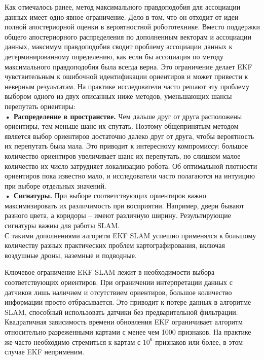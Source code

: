 \documentclass[10pt,a4paper]{article}
\begin{document}
Как отмечалось ранее, метод максимального правдоподобия для ассоциации данных имеет одно явное ограничение. Дело в том, что он отходит от идеи полной апостериорной оценки в вероятностной робототехнике. Вместо поддержки общего апостериорного распределения по дополненным векторам и ассоциации данных, максимум правдоподобия сводит проблему ассоциации данных к детерминированному определению, как если бы ассоциация по методу максимального правдоподобия была всегда верна. Это ограничение делает EKF чувствительным к ошибочной идентификации ориентиров и может привести к неверным результатам. На практике исследователи часто решают эту проблему выбором одного из двух описанных ниже методов, уменьшающих шансы перепутать ориентиры:\\

\textbf{•	Распределение в пространстве.} Чем дальше друг от друга расположены ориентиры, тем меньше шанс их спутать. Поэтому общепринятым методом является выбор ориентиров достаточно далеко друг от друга, чтобы вероятность их перепутать была мала. Это приводит к интересному компромиссу: большое количество ориентиров увеличивает шанс их перепутать, но слишком малое количество их число затрудняет локализацию робота. Об оптимальной плотности ориентиров пока известно мало, и исследователи часто полагаются на интуицию при выборе отдельных значений.\\

\textbf{•	Сигнатуры.} При выборе соответствующих ориентиров важно максимизировать их различимость при восприятии. Например, двери бывают разного цвета, а коридоры – имеют различную ширину. Результирующие сигнатуры важны для работы SLAM.\\

С такими дополнениями алгоритм EKF SLAM успешно применялся к большому количеству разных практических проблем картографирования, включая воздушные дроны, наземные и подводные.

Ключевое ограничение EKF SLAM лежит в необходимости выбора соответствующих ориентиров. При ограничении интерпретации данных с датчиков лишь наличием и отсутствием ориентиров, большое количество информации просто отбрасывается. Это приводит к потере данных в алгоритме SLAM, способный использовать датчики без предварительной фильтрации. Квадратичная зависимость времени обновления EKF ограничивает алгоритм относительно разреженными картами с менее чем 1000 признаков. На практике же часто необходимо стремиться к картам с $10^6$ признаков или более, в этом случае EKF неприменим.
\end{document}
